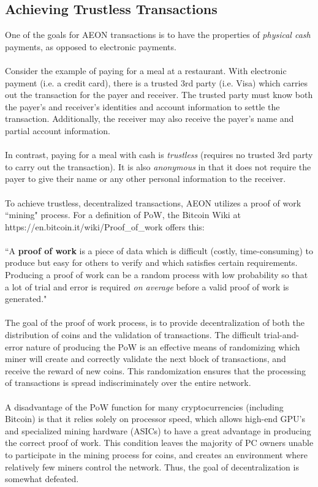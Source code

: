 \subsection{Achieving Trustless Transactions}
\label{secPoW} 
One of the goals for AEON transactions is to have the properties of \textit{physical cash} payments, as opposed to electronic payments.\\
\\
Consider the example of paying for a meal at a restaurant. With electronic payment (i.e. a credit card), there is a trusted 3rd party (i.e. Visa) which carries out the transaction for the payer and receiver. The trusted party must know both the payer's and receiver's identities and account information to settle the transaction. Additionally, the receiver may also receive the payer's name and partial account information.\\
\\
In contrast, paying for a meal with cash is \textit{trustless} (requires no trusted 3rd party to carry out the transaction). It is also \textit{anonymous} in that it does not require the payer to give their name or any other personal information to the receiver.\\
\\
To achieve trustless, decentralized transactions, AEON utilizes a proof of work “mining" process.  For a definition of PoW, the Bitcoin Wiki at https://en.bitcoin.it/wiki/Proof\_of\_work offers this:\\
\\
“A \textbf{proof of work} is a piece of data which is difficult (costly, time-consuming) to produce but easy for others to verify and which satisfies certain requirements. Producing a proof of work can be a random process with low probability so that a lot of trial and error is required \textit{on average} before a valid proof of work is generated."\\
\\
The goal of the proof of work process, is to provide decentralization of both the distribution of coins and the validation of transactions. The difficult trial-and-error nature of producing the PoW is an effective means of randomizing which miner will create and correctly validate the next block of transactions, and receive the reward of new coins. This randomization ensures that the processing of transactions is spread indiscriminately over the entire network.\\
\\
A disadvantage of the PoW function for many cryptocurrencies (including Bitcoin) is that it relies solely on processor speed, which allows high-end GPU's and specialized mining hardware (ASICs) to have a great advantage in producing the correct proof of work. This condition leaves the majority of PC owners unable to participate in the mining process for coins, and creates an environment where relatively few miners control the network.  Thus, the goal of decentralization is somewhat defeated.\\
